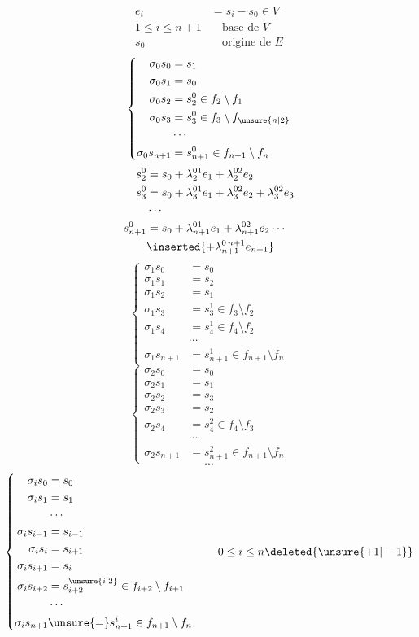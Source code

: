\[
\begin{aligned}
e_i&=s_i-s_0\in V\\
1\leq i\leq n+1&\quad\text{base de }V\\
s_0&\quad\text{origine de }E
\end{aligned}
\]
\[
\left\{\begin{aligned}
\sigma_0s_0&=s_1\\
\sigma_0s_1&=s_0\\
\sigma_0s_2&=s_2^0\in f_2\setminus f_1\\
\sigma_0s_3&=s_3^0\in f_3\setminus f_{\unsure{n|2}}\\
&\cdots\\
\sigma_0s_{n+1}&=s_{n+1}^0\in f_{n+1}\setminus f_n
\end{aligned}\right.
\]
\[
\begin{aligned}
s_2^0&=s_0+\lambda_2^{01}e_1+\lambda_2^{02}e_2\\
s_3^0&=s_0+\lambda_3^{01}e_1+\lambda_3^{02}e_2+\lambda_3^{02}e_3\\
&\cdots\\
s_{n+1}^0&=s_0+\lambda_{n+1}^{01}e_1+\lambda_{n+1}^{02}e_2\cdots\\
&\inserted{+\lambda_{n+1}^{0\,n+1}e_{n+1}}
\end{aligned}
\]
\[
\left\{\begin{aligned}
\sigma_1s_0&=s_0\\
\sigma_1s_1&=s_2\\
\sigma_1s_2&=s_1\\
\sigma_1s_3&=s_3^1\in f_3\setminus f_2\\
\sigma_1s_4&=s_4^1\in f_4\setminus f_2\\
&\cdots\\
\sigma_1s_{n+1}&=s_{n+1}^1\in f_{n+1}\setminus f_n
\end{aligned}\right.
\]
\[
\left\{\begin{aligned}
\sigma_2s_0&=s_0\\
\sigma_2s_1&=s_1\\
\sigma_2s_2&=s_3\\
\sigma_2s_3&=s_2\\
\sigma_2s_4&=s_4^2\in f_4\setminus f_3\\
&\cdots\\
\sigma_2s_{n+1}&=s_{n+1}^2\in f_{n+1}\setminus f_n
\end{aligned}\right.
\]
\[
\cdots
\]
\[
\left\{\begin{aligned}
\sigma_i s_0&=s_0\\
\sigma_i s_1&=s_1\\
&\cdots\\
\sigma_i s_{i-1}&=s_{i-1}\\
\sigma_i s_i&=s_{i+1}\\
\sigma_i s_{i+1}&=s_i\\
\sigma_i s_{i+2}&=s_{i+2}^{\unsure{i|2}}\in f_{i+2}\setminus f_{i+1}\\
&\cdots\\
\sigma_i s_{n+1}&\unsure{=}s_{n+1}^i\in f_{n+1}\setminus f_n
\end{aligned}\right.\qquad0\leq i\leq n\deleted{\unsure{+1|-1}}
\]

